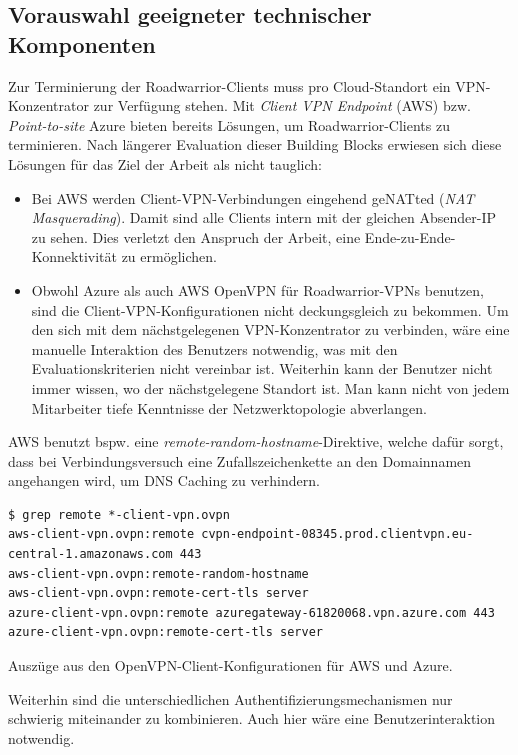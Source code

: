 \subsection{Vorauswahl geeigneter technischer Komponenten}\label{uc1-vorauswahl}
Zur Terminierung der Roadwarrior-Clients muss pro Cloud-Standort ein VPN-Konzentrator zur Verfügung stehen. Mit \textit{Client VPN Endpoint} (AWS) bzw. \textit{Point-to-site} Azure bieten bereits Lösungen, um Roadwarrior-Clients zu terminieren. Nach längerer Evaluation dieser Building Blocks erwiesen sich diese Lösungen für das Ziel der Arbeit als nicht tauglich:
\begin{itemize}
\item Bei AWS werden Client-VPN-Verbindungen eingehend geNATted (\textit{NAT Masquerading}). Damit sind alle Clients intern mit der gleichen Absender-IP zu sehen. Dies verletzt den Anspruch der Arbeit, eine Ende-zu-Ende-Konnektivität zu ermöglichen.
\item Obwohl Azure als auch AWS OpenVPN für Roadwarrior-VPNs benutzen, sind die Client-VPN-Konfigurationen nicht \glqq deckungsgleich\grqq{} zu bekommen. Um den sich mit dem nächstgelegenen VPN-Konzentrator zu verbinden, wäre eine manuelle Interaktion des Benutzers notwendig, was mit den Evaluationskriterien nicht vereinbar ist. Weiterhin kann der Benutzer nicht immer wissen, wo der nächstgelegene Standort ist. Man kann nicht von jedem Mitarbeiter tiefe Kenntnisse der Netzwerktopologie abverlangen.
\end{itemize}
AWS benutzt bspw. eine \textit{remote-random-hostname}-Direktive, welche dafür sorgt, dass bei Verbindungsversuch eine Zufallszeichenkette an den Domainnamen angehangen wird, um DNS Caching zu verhindern.
\begin{listing}[h]
\begin{verbatim}
$ grep remote *-client-vpn.ovpn
aws-client-vpn.ovpn:remote cvpn-endpoint-08345.prod.clientvpn.eu-central-1.amazonaws.com 443
aws-client-vpn.ovpn:remote-random-hostname
aws-client-vpn.ovpn:remote-cert-tls server
azure-client-vpn.ovpn:remote azuregateway-61820068.vpn.azure.com 443
azure-client-vpn.ovpn:remote-cert-tls server

\end{verbatim}
\caption{Auszüge aus den OpenVPN-Client-Konfigurationen für AWS und Azure.}
\label{ovpn-client-config-remote}
\end{listing}
Weiterhin sind die unterschiedlichen Authentifizierungsmechanismen nur schwierig miteinander zu kombinieren. Auch hier wäre eine Benutzerinteraktion notwendig.\\
